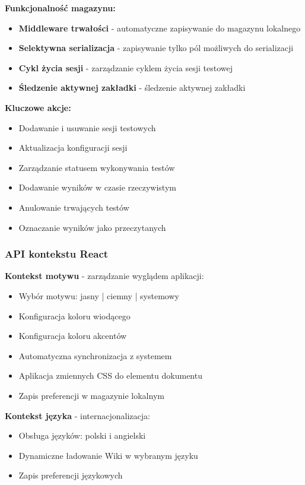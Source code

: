\documentclass[12pt,a4paper]{article}
\begin{document}
\textbf{Funkcjonalność magazynu:}
\begin{itemize}
    \item \textbf{Middleware trwałości} - automatyczne zapisywanie do magazynu lokalnego
    \item \textbf{Selektywna serializacja} - zapisywanie tylko pól możliwych do serializacji
    \item \textbf{Cykl życia sesji} - zarządzanie cyklem życia sesji testowej
    \item \textbf{Śledzenie aktywnej zakładki} - śledzenie aktywnej zakładki
\end{itemize}

\textbf{Kluczowe akcje:}
\begin{itemize}
    \item Dodawanie i usuwanie sesji testowych
    \item Aktualizacja konfiguracji sesji
    \item Zarządzanie statusem wykonywania testów
    \item Dodawanie wyników w czasie rzeczywistym
    \item Anulowanie trwających testów
    \item Oznaczanie wyników jako przeczytanych
\end{itemize}

\subsubsection{API kontekstu React}

\textbf{Kontekst motywu} - zarządzanie wyglądem aplikacji:
\begin{itemize}
    \item Wybór motywu: jasny | ciemny | systemowy
    \item Konfiguracja koloru wiodącego
    \item Konfiguracja koloru akcentów
    \item Automatyczna synchronizacja z systemem
    \item Aplikacja zmiennych CSS do elementu dokumentu
    \item Zapis preferencji w magazynie lokalnym
\end{itemize}

\textbf{Kontekst języka} - internacjonalizacja:
\begin{itemize}
    \item Obsługa języków: polski i angielski
    \item Dynamiczne ładowanie Wiki w wybranym języku
    \item Zapis preferencji językowych
\end{itemize}
\end{document}
